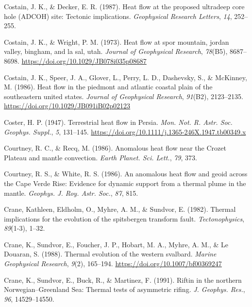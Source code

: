 \documentclass[draft,linenumbers]{agujournal2018}
\begin{document}
\leavevmode{}%
Costain, J. K., \& Decker, E. R. (1987). Heat flow at the proposed
ultradeep core hole (ADCOH) site: Tectonic implications.
\emph{Geophysical Research Letters}, \emph{14}, 252--255.

\leavevmode{}%
Costain, J. K., \& Wright, P. M. (1973). Heat flow at spor mountain,
jordan valley, bingham, and la sal, utah. \emph{Journal of Geophysical
Research}, \emph{78}(B5), 8687--8698.
\url{https://doi.org/10.1029/JB078i035p08687}

\leavevmode{}%
Costain, J. K., Speer, J. A., Glover, L., Perry, L. D., Dashevsky, S.,
\& McKinney, M. (1986). Heat flow in the piedmont and atlantic coastal
plain of the southeastern united states. \emph{Journal of Geophysical
Research}, \emph{91}(B2), 2123--2135.
\url{https://doi.org/10.1029/JB091iB02p02123}

\leavevmode{}%
Coster, H. P. (1947). Terrestrial heat flow in {Persia}. \emph{Mon. Not.
R. Astr. Soc. Geophys. Suppl.}, \emph{5}, 131--145.
\url{https://doi.org/10.1111/j.1365-246X.1947.tb00349.x}

\leavevmode{}%
Courtney, R. C., \& Recq, M. (1986). Anomalous heat flow near the
{Crozet Plateau} and mantle convection. \emph{Earth Planet. Sci. Lett.},
\emph{79}, 373.

\leavevmode{}%
Courtney, R. S., \& White, R. S. (1986). An anomalous heat flow and
geoid across the {Cape Verde Rise}: Evidence for dynamic support from a
thermal plume in the mantle. \emph{Geophys. J. Roy. Astr. Soc.},
\emph{87}, 815.

\leavevmode{}%
Crane, Kathleen, Eldholm, O., Myhre, A. M., \& Sundvor, E. (1982).
Thermal implications for the evolution of the spitsbergen transform
fault. \emph{Tectonophysics}, \emph{89}(1-3), 1--32.

\leavevmode{}%
Crane, K., Sundvor, E., Foucher, J. P., Hobart, M. A., Myhre, A. M., \&
Le Douaran, S. (1988). Thermal evolution of the western svalbard.
\emph{Marine Geophysical Research}, \emph{9}(2), 165--194.
\url{https://doi.org/10.1007/bf00369247}

\leavevmode{}%
Crane, K., Sundvor, E., Buck, R., \& Martinez, F. (1991). Riftin in the
northern {Norwegian--Greenland Sea}: Thermal tests of asymmetric rifing.
\emph{J. Geophys. Res.}, \emph{96}, 14529--14550.
\end{document}
